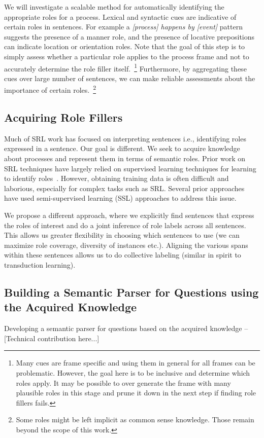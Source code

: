 We will investigate a scalable method for automatically identifying the appropriate roles for a process. 
Lexical and syntactic cues are indicative of certain roles in sentences. 
For example a {\em [process] happens by [event]} pattern suggests the presence of a manner role, and the presence of locative prepositions can indicate location or orientation roles. 
Note that the goal of this step is to simply assess whether a particular role applies to the process frame and not to accurately determine the role filler itself.~\footnote{
Many cues are frame specific and using them in general for all frames can be problematic. 
However, the goal here is to be inclusive and determine which roles apply. 
It may be possible to over generate the frame with many plausible roles in this stage and prune it down in the next step if finding role fillers fails.} 
Furthermore, by aggregating these cues over large number of sentences, we can make reliable assessments about the importance of certain roles.~\footnote{
Some roles might be left implicit as common sense knowledge. 
Those remain beyond the scope of this work.} 

\subsection{Acquiring Role Fillers}

Much of SRL work has focused on interpreting sentences i.e., identifying roles expressed in a sentence.
Our goal is different. We seek to acquire knowledge about processes and represent them in terms of semantic roles.
Prior work on SRL techniques have largely relied on supervised learning techniques for learning to identify roles~\cite{}.
However, obtaining training data is often difficult and laborious, especially for complex tasks such as SRL.
Several prior approaches have used semi-supervised learning (SSL) approaches to address this issue. 

We propose a different approach, where we explicitly find sentences that express the roles of interest and do a joint inference of role labels across all sentences. 
This allows us greater flexibility in choosing which sentences to use (we can maximize role coverage, diversity of instances etc.).
Aligning the various spans within these sentences allows us to do collective labeling (similar in spirit to transduction learning).


\subsection{Building a Semantic Parser for Questions using the Acquired Knowledge}

Developing a semantic parser for questions based on the acquired knowledge -- [Technical contribution here...]

%